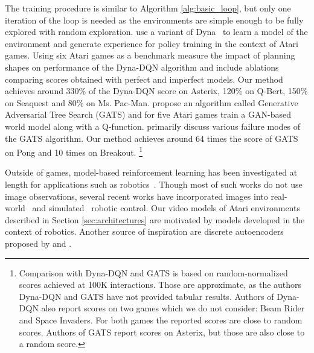 The training procedure is similar to  Algorithm \ref{alg:basic_loop}, but only one iteration of the loop is needed as the environments are simple enough to be fully explored with random exploration. \citet{dyna_dqn} use a variant of Dyna~\cite{dyna} to learn a model of the environment and generate experience for policy training in the context of Atari games. Using six Atari games as a benchmark \citet{dyna_dqn} measure the impact of planning shapes on performance of the Dyna-DQN algorithm and include ablations comparing scores obtained with perfect and imperfect models. Our method achieves around 330\% of the Dyna-DQN score on Asterix, 120\% on Q-Bert, 150\% on Seaquest and 80\% on Ms. Pac-Man. \cite{gats} propose an algorithm called Generative Adversarial Tree Search (GATS) and for five Atari games train a GAN-based world model along with a Q-function. \cite{gats} primarily discuss various failure modes of the GATS algorithm. Our method achieves around 64 times the score of GATS on Pong and 10 times on Breakout. \footnote{Comparison with Dyna-DQN and GATS is based on  random-normalized scores achieved at 100K interactions. Those are approximate, as the authors Dyna-DQN and GATS have not provided tabular results. Authors of Dyna-DQN also report scores on two games which we do not consider: Beam Rider and Space Invaders. For both games the reported scores are close to  random scores. Authors of GATS report scores on Asterix, but those are also close to a random score.}




Outside of games, model-based reinforcement learning has been investigated at length for applications such as robotics~\cite{deisenroth}. Though most of such works do not use image observations, several recent works
have incorporated images into real-world~\cite{deep_spatial, finn2016, sv2p, ebert, piergiovanni, paxton, rybkin-pertsch,ebert2018visual} and simulated~\cite{embed_to_control, hafner} robotic control. 
Our video models of Atari environments described in Section \ref{sec:architectures} are motivated by models developed in the context of robotics. Another source of inspiration are discrete autoencoders proposed by \citet{neural_discrete} and \citet{auto_discrete}.


